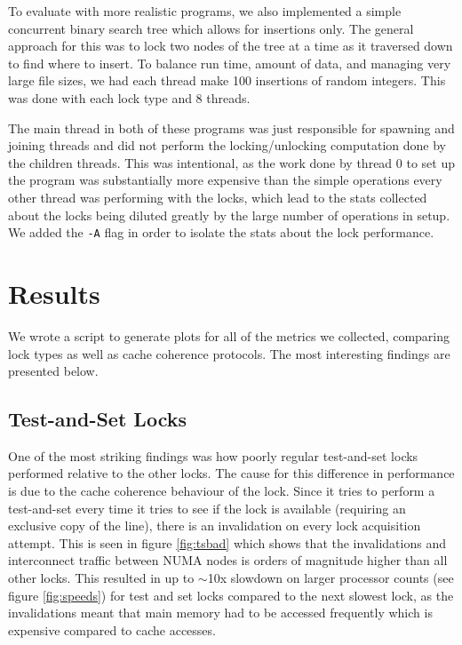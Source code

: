 \documentclass{article}
\begin{document}
To evaluate with more realistic programs, we also implemented a simple concurrent binary search tree which allows for insertions only.  The general approach for this was to lock two nodes of the tree at a time as it traversed down to find where to insert.  To balance run time, amount of data, and managing very large file sizes, we had each thread make 100 insertions of random integers.  This was done with each lock type and 8 threads.

The main thread in both of these programs was just responsible for spawning and joining threads and did not perform the locking/unlocking computation done by the children threads.  This was intentional, as the work done by thread 0 to set up the program was substantially more expensive than the simple operations every other thread was performing with the locks, which lead to the stats collected about the locks being diluted greatly by the large number of operations in setup.  We added the {\tt -A} flag in order to isolate the stats about the lock performance.

\section{Results}

We wrote a script to generate plots for all of the metrics we collected, comparing lock types as well as cache coherence protocols. The most interesting findings are presented below.

\subsection{Test-and-Set Locks}
One of the most striking findings was how poorly regular test-and-set locks performed relative to the other locks.  The cause for this difference in performance is due to the cache coherence behaviour of the lock. Since it tries to perform a test-and-set every time it tries to see if the lock is available (requiring an exclusive copy of the line), there is an invalidation on every lock acquisition attempt.  This is seen in figure \ref{fig:tsbad} which shows that the invalidations and interconnect traffic between NUMA nodes is orders of magnitude higher than all other locks. This resulted in up to $\sim$10x slowdown on larger processor counts (see figure \ref{fig:speeds}) for test and set locks compared to the next slowest lock, as the invalidations meant that main memory had to be accessed frequently which is expensive compared to cache accesses.
\end{document}
